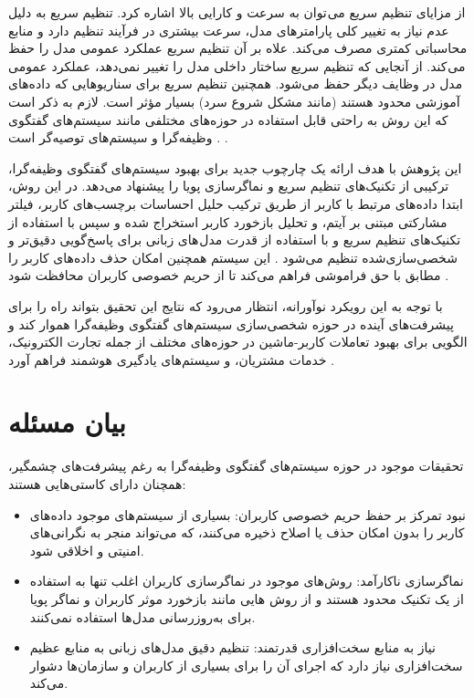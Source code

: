 از مزایای تنظیم سریع می توان به سرعت و کارایی بالا اشاره کرد. تنظیم سریع به دلیل عدم نیاز به تغییر کلی پارامترهای مدل، سرعت بیشتری در فرآیند تنظیم دارد و منابع محاسباتی کمتری مصرف می‌کند.
علاه بر آن تنظیم سریع عملکرد عمومی مدل را حفظ می کند. از آنجایی که تنظیم سریع ساختار داخلی مدل را تغییر نمی‌دهد، عملکرد عمومی مدل در وظایف دیگر حفظ می‌شود.
همچنین تنظیم سریع برای سناریوهایی که داده‌های آموزشی محدود هستند (مانند مشکل شروع سرد) بسیار مؤثر است. لازم به ذکر است که این روش به راحتی قابل استفاده در حوزه‌های مختلفی مانند سیستم‌های گفتگوی وظیفه‌گرا و سیستم‌های توصیه‌گر است%
\cite{kasahara2022building}.
.



این پژوهش با هدف ارائه یک چارچوب جدید برای بهبود سیستم‌های گفتگوی وظیفه‌گرا، ترکیبی از تکنیک‌های تنظیم سریع و نماگر‌سازی پویا را پیشنهاد می‌دهد. در این روش، ابتدا داده‌های مرتبط با کاربر از طریق ترکیب حلیل احساسات برچسب‌های کاربر، فیلتر مشارکتی مبتنی بر آیتم، و تحلیل بازخورد کاربر استخراج شده و سپس با استفاده از تکنیک‌های تنظیم سریع و با استفاده از قدرت مدل های زبانی برای پاسخ‌گویی دقیق‌تر و شخصی‌سازی‌شده تنظیم می‌شود 
\cite{elahi2023hybrid}. 
این سیستم همچنین امکان حذف داده‌های کاربر را مطابق با حق فراموشی فراهم می‌کند تا از حریم خصوصی کاربران محافظت شود 
\cite{zhang2024right}.

با توجه به این رویکرد نوآورانه، انتظار می‌رود که نتایج این تحقیق بتواند راه را برای پیشرفت‌های آینده در حوزه شخصی‌سازی سیستم‌های گفتگوی وظیفه‌گرا هموار کند و الگویی برای بهبود تعاملات کاربر-ماشین در حوزه‌های مختلف از جمله تجارت الکترونیک، خدمات مشتریان، و سیستم‌های یادگیری هوشمند فراهم آورد 
\cite{chen2023zero}.

\section{بیان مسئله}
تحقیقات موجود در حوزه سیستم‌های گفتگوی وظیفه‌گرا به رغم پیشرفت‌های چشمگیر، همچنان دارای کاستی‌هایی هستند:
\begin{itemize}
\item
نبود تمرکز بر حفظ حریم خصوصی کاربران: بسیاری از سیستم‌های موجود داده‌های کاربر را بدون امکان حذف یا اصلاح ذخیره می‌کنند، که می‌تواند منجر به نگرانی‌های امنیتی و اخلاقی شود.
\item
نماگر‌سازی ناکارآمد: روش‌های موجود در نماگر‌سازی کاربران اغلب تنها به استفاده از یک تکنیک محدود هستند و از روش هایی مانند بازخورد موثر کاربران و نماگر پویا برای به‌روزرسانی مدل‌ها استفاده نمی‌کنند.
\item
نیاز به منابع سخت‌افزاری قدرتمند: تنظیم دقیق مدل‌های زبانی به منابع عظیم سخت‌افزاری نیاز دارد که اجرای آن را برای بسیاری از کاربران و سازمان‌ها دشوار می‌کند.
\end{itemize}

